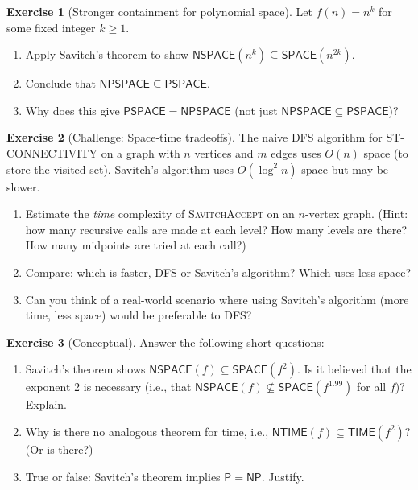 \documentclass[12pt,a4paper]{article}
\theoremstyle{plain}
\theoremstyle{definition}
\newtheorem{exercise}{Exercise}[section]
\theoremstyle{remark}
\newcommand{\SPACE}{\mathsf{SPACE}}
\newcommand{\NSPACE}{\mathsf{NSPACE}}
\newcommand{\PSPACE}{\mathsf{PSPACE}}
\newcommand{\NPSPACE}{\mathsf{NPSPACE}}
\newcommand{\NP}{\mathsf{NP}}
\newcommand{\PP}{\mathsf{P}}
\newcommand{\TIME}{\mathsf{TIME}}
\newcommand{\NTIME}{\mathsf{NTIME}}
\begin{document}
\begin{exercise}[Stronger containment for polynomial space]\label{ex:poly}
Let $f(n) = n^k$ for some fixed integer $k \geq 1$.
\begin{enumerate}[label=(\alph*)]
  \item Apply Savitch's theorem to show $\NSPACE(n^k) \subseteq \SPACE(n^{2k})$.
  \item Conclude that $\NPSPACE \subseteq \PSPACE$.
  \item Why does this give $\PSPACE = \NPSPACE$ (not just $\NPSPACE \subseteq \PSPACE$)?
\end{enumerate}
\end{exercise}

\begin{exercise}[Challenge: Space-time tradeoffs]\label{ex:challenge}
The naive DFS algorithm for ST-CONNECTIVITY on a graph with $n$ vertices and $m$ edges uses $O(n)$ space (to store the visited set). Savitch's algorithm uses $O(\log^2 n)$ space but may be slower.
\begin{enumerate}[label=(\alph*)]
  \item Estimate the \emph{time} complexity of \textsc{SavitchAccept} on an $n$-vertex graph. (Hint: how many recursive calls are made at each level? How many levels are there? How many midpoints are tried at each call?)
  \item Compare: which is faster, DFS or Savitch's algorithm? Which uses less space?
  \item Can you think of a real-world scenario where using Savitch's algorithm (more time, less space) would be preferable to DFS?
\end{enumerate}
\end{exercise}

\begin{exercise}[Conceptual]\label{ex:conceptual}
Answer the following short questions:
\begin{enumerate}[label=(\alph*)]
  \item Savitch's theorem shows $\NSPACE(f) \subseteq \SPACE(f^2)$. Is it believed that the exponent 2 is necessary (i.e., that $\NSPACE(f) \not\subseteq \SPACE(f^{1.99})$ for all $f$)? Explain.
  \item Why is there no analogous theorem for time, i.e., $\NTIME(f) \subseteq \TIME(f^2)$? (Or is there?)
  \item True or false: Savitch's theorem implies $\PP = \NP$. Justify.
\end{enumerate}
\end{exercise}
\end{document}
